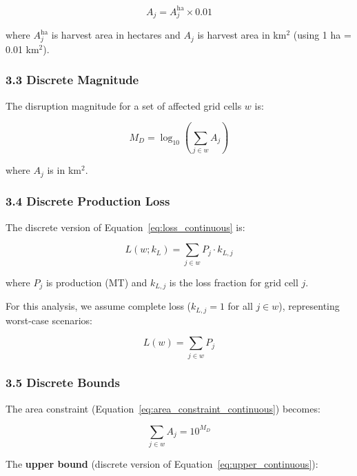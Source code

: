 \documentclass[11pt]{article}
\begin{document}
\begin{equation}
A_j = A_j^{\text{ha}} \times 0.01
\label{eq:unit_conversion}
\end{equation}

where $A_j^{\text{ha}}$ is harvest area in hectares and $A_j$ is harvest area in km$^2$ (using 1 ha = 0.01 km$^2$).

\subsubsection*{3.3 Discrete Magnitude}
The disruption magnitude for a set of affected grid cells $w$ is:

\begin{equation}
M_D = \log_{10}\left(\sum_{j \in w} A_j\right)
\label{eq:magnitude_discrete}
\end{equation}

where $A_j$ is in km$^2$.

\subsubsection*{3.4 Discrete Production Loss}
The discrete version of Equation~\ref{eq:loss_continuous} is:

\begin{equation}
L(w; k_L) = \sum_{j \in w} P_j \cdot k_{L,j}
\label{eq:loss_discrete}
\end{equation}

where $P_j$ is production (MT) and $k_{L,j}$ is the loss fraction for grid cell $j$.

For this analysis, we assume complete loss ($k_{L,j} = 1$ for all $j \in w$), representing worst-case scenarios\cite{lobell2011climate, porter2014food}:

\begin{equation}
L(w) = \sum_{j \in w} P_j
\label{eq:loss_complete}
\end{equation}

\subsubsection*{3.5 Discrete Bounds}
The area constraint (Equation~\ref{eq:area_constraint_continuous}) becomes:

\begin{equation}
\sum_{j \in w} A_j = 10^{M_D}
\label{eq:area_constraint_discrete}
\end{equation}

The \textbf{upper bound} (discrete version of Equation~\ref{eq:upper_continuous}):
\end{document}
